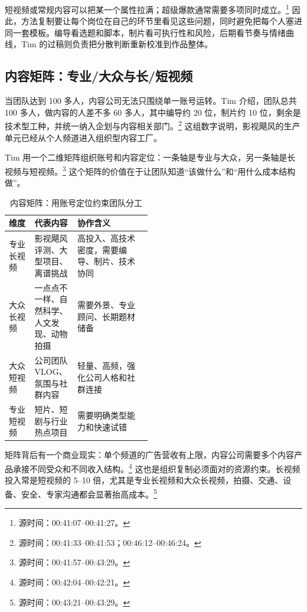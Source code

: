 \documentclass[a4paper]{article}
\begin{document}
短视频或常规内容可以把某一个属性拉满；超级爆款通常需要多项同时成立。\footnote{源时间：00:41:07--00:41:27。} 因此，方法复制要让每个岗位在自己的环节里看见这些问题，同时避免把每个人塞进同一套模板。编导看选题和脚本，制片看可执行性和风险，后期看节奏与情绪曲线，Tim 的过稿则负责把分散判断重新校准到作品整体。

\subsection{内容矩阵：专业/大众与长/短视频}

当团队达到 100 多人，内容公司无法只围绕单一账号运转。Tim 介绍，团队总共 100 多人，做内容的人差不多 60 多人，其中编导约 20 位，制片约 10 位，剩余是技术型工种，并统一纳入企划与内容相关部门。\footnote{源时间：00:41:33--00:41:53；00:46:12--00:46:24。} 这组数字说明，影视飓风的生产单元已经从个人频道进入组织型内容工厂。

Tim 用一个二维矩阵组织账号和内容定位：一条轴是专业与大众，另一条轴是长视频与短视频。\footnote{源时间：00:41:57--00:43:29。} 这个矩阵的价值在于让团队知道“该做什么”和“用什么成本结构做”。

\begin{table}[htbp]
  \centering
  \caption{内容矩阵：用账号定位约束团队分工}
  \label{tab:content-matrix}
  \small
  \renewcommand{\arraystretch}{1.18}
  \begin{tabularx}{\linewidth}{>{\raggedright\arraybackslash}p{0.18\linewidth}>{\raggedright\arraybackslash}p{0.30\linewidth}>{\raggedright\arraybackslash}X}
    \toprule
    维度 & 代表内容 & 协作含义 \\
    \midrule
    专业长视频 & 影视飓风评测、大型项目、离谱挑战 & 高投入、高技术密度，需要编导、制片、技术协同 \\
    大众长视频 & 一点点不一样、自然科学、人文发现、动物拍摄 & 需要外景、专业顾问、长期题材储备 \\
    大众短视频 & 公司团队 VLOG、氛围与社群内容 & 轻量、高频，强化公司人格和社群连接 \\
    专业短视频 & 短片、短剧与行业热点项目 & 需要明确类型能力和快速试错 \\
    \bottomrule
  \end{tabularx}
\end{table}

矩阵背后有一个商业现实：单个频道的广告营收有上限，内容公司需要多个内容产品承接不同受众和不同收入结构。\footnote{源时间：00:42:04--00:42:21。} 这也是组织复制必须面对的资源约束。长视频投入常是短视频的 5--10 倍，尤其是专业长视频和大众长视频，拍摄、交通、设备、安全、专家沟通都会显著抬高成本。\footnote{源时间：00:43:21--00:43:29。}
\end{document}
